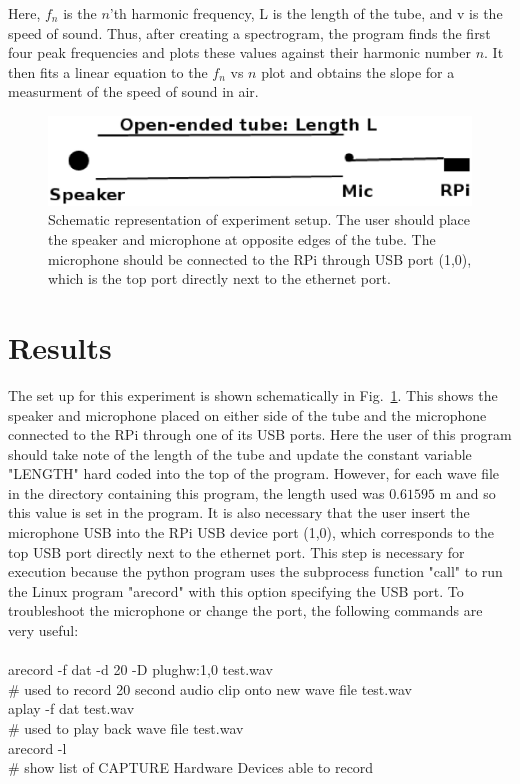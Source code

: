 \documentclass[12pt]{article}
\begin{document}
Here, $f_n$ is the $n$'th harmonic frequency, L is the length of the tube, and
v is the speed of sound. Thus, after creating a spectrogram, the program finds
the first four peak frequencies and plots these values against their harmonic
number $n$. It then fits a linear equation to the $f_n$ vs $n$ plot and obtains
the slope for a measurment of the speed of sound in air.

\begin{figure}[h]
\begin{center}
\includegraphics[width=300bp]{exp_setup.eps}
\vspace{-18bp}
\end{center}
\caption[]{\label{fig:setup}\small
Schematic representation of experiment setup. The user should place the speaker 
and microphone at opposite edges of the tube. The microphone should be connected
to the RPi through USB port (1,0), which is the top port directly next to the
ethernet port.
}
\end{figure}

\section{Results}
The set up for this experiment is shown schematically in Fig.~\ref{fig:setup}.
This shows the speaker and microphone placed on either side of the tube and
the microphone connected to the RPi through one of its USB ports. Here the user
of this program should take note of the length of the tube and update the
constant variable "LENGTH" hard coded into the top of the program. However,
for each wave file in the directory containing this program, the length used
was $0.61595$ m and so this value is set in the program. It is also
necessary that the user insert the microphone USB into the RPi USB device port
(1,0), which corresponds to the top USB port directly next to the ethernet
port. This step is necessary for execution because the python program uses
the subprocess function "call" to run the Linux program "arecord" with this
option specifying the USB port. To troubleshoot the microphone or change the
port, the following commands are very useful:
\\
\\
arecord -f dat -d 20 -D plughw:1,0 test.wav\\
\# used to record 20 second audio clip onto new wave file test.wav\\
aplay -f dat test.wav\\
\# used to play back wave file test.wav\\
arecord -l\\
\# show list of CAPTURE Hardware Devices able to record
\\
\end{document}
